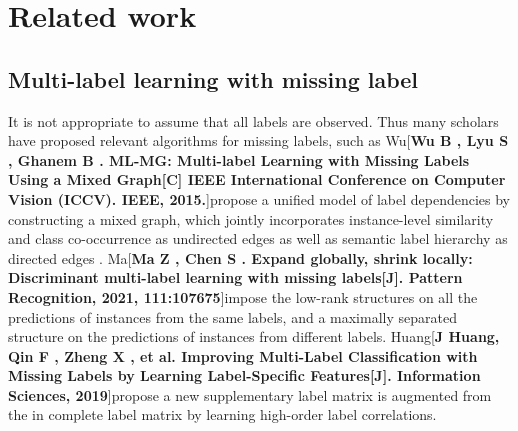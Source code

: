 \documentclass[final,3p,times]{elsarticle}
\begin{document}
\section{Related work}
\subsection{Multi-label learning with missing label}

It is not appropriate to assume that all labels are observed. Thus many scholars have proposed relevant algorithms for missing labels, such as Wu[\textbf{Wu B , Lyu S , Ghanem B . ML-MG: Multi-label Learning with Missing Labels Using a Mixed Graph[C] IEEE International Conference on Computer Vision (ICCV). IEEE, 2015.}]propose a unified model of label dependencies by constructing a mixed graph, which jointly incorporates instance-level similarity and class co-occurrence as undirected edges as well as semantic label hierarchy as directed edges . Ma[\textbf{Ma Z , Chen S . Expand globally, shrink locally: Discriminant multi-label learning with missing labels[J]. Pattern Recognition, 2021, 111:107675}]impose the low-rank structures on all the predictions of instances from the same labels, and a maximally separated structure on the predictions of instances from different labels. Huang[\textbf{J Huang, Qin F , Zheng X , et al. Improving Multi-Label Classification with Missing Labels by Learning Label-Specific Features[J]. Information Sciences, 2019}]propose a new supplementary label matrix is augmented from the in complete label matrix by learning high-order label correlations.
\end{document}
